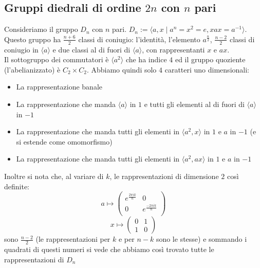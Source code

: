 \documentclass[a4paper,NoNotes,GeneralMath]{stdmdoc}
\newcommand{\gen}[1]{\langle #1 \rangle}
\begin{document}
	\subsection{Gruppi diedrali di ordine $2n$ con $n$ pari}
	Consideriamo il gruppo $D_{n}$ con $n$ pari. $D_{n} := \langle a, x \mid a^n = x^2 = e, xax = a^{-1} \rangle$. Questo gruppo ha $\frac{n+6}{2}$ classi di coniugio: l'identità, l'elemento $a^{\frac{n}{2}}$, $\frac{n-2}{2}$ classi di coniugio in $\gen{a}$ e due classi al di fuori di $\gen{a}$, con rappresentanti $x$ e $ax$. \\
	Il sottogruppo dei commutatori è $\gen{a^2}$ che ha indice $4$ ed il gruppo quoziente (l'abelianizzato) è $C_2 \times C_2$. Abbiamo quindi solo $4$ caratteri uno dimensionali:
	\begin{itemize}
		\item La rappresentazione banale
		\item La rappresentazione che manda $\gen{a}$ in $1$ e tutti gli elementi al di fuori di $\gen{a}$ in $-1$
		\item La rappresentazione che manda tutti gli elementi in $\gen{a^2, x}$ in $1$ e $a$ in $-1$ (e si estende come omomorfismo)
		\item La rappresentazione che manda tutti gli elementi in $\gen{a^2, ax}$ in $1$ e $a$ in $-1$
	\end{itemize}
	Inoltre si nota che, al variare di $k$, le rappresentazioni di dimensione $2$ così definite: $$a \mapsto \left( \begin{array}{cc} e^{ \frac{2\pi ik}{n} } & 0 \\ 0 & e^{ \frac{ -2\pi ik}{n} } \\ \end{array} \right) $$ $$x \mapsto \left( \begin{array}{cc} 0 & 1 \\ 1 & 0 \end{array} \right)$$ sono $\frac{n-2}{2}$ (le rappresentazioni per $k$ e per $n-k$ sono le stesse) e sommando i quadrati di questi numeri si vede che abbiamo così trovato tutte le rappresentazioni di $D_{n}$
\end{document}
